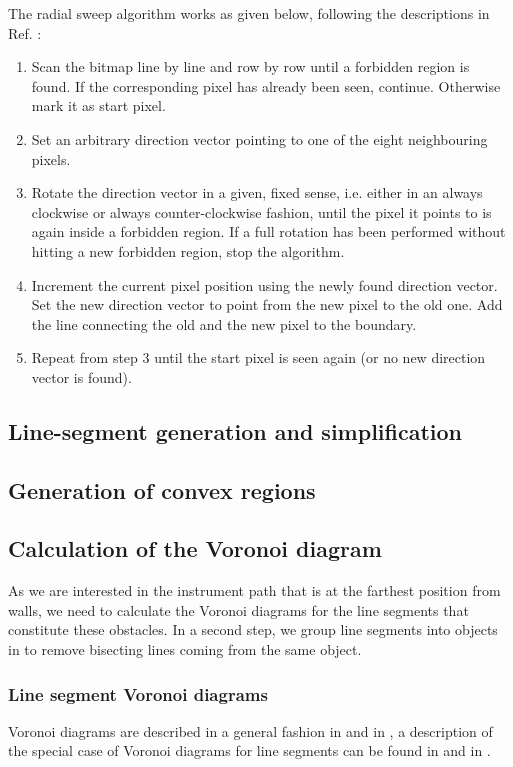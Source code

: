 The radial sweep algorithm works as given below, following the descriptions in Ref. \cite{web_radial_sweep}:
\begin{enumerate}
	\item Scan the bitmap line by line and row by row until a forbidden region is found. 
		If the corresponding pixel has already been seen, continue. Otherwise mark it as start pixel.
	\item Set an arbitrary direction vector pointing to one of the eight neighbouring pixels.
	\item Rotate the direction vector in a given, fixed sense, i.e. either in an always clockwise or 
		always counter-clockwise fashion, until the pixel it points to is again inside a forbidden region.
		If a full rotation has been performed without hitting a new forbidden region, stop the algorithm.
	\item Increment the current pixel position using the newly found direction vector. 
		Set the new direction vector to point from the new pixel to the old one.
		Add the line connecting the old and the new pixel to the boundary.
	\item Repeat from step 3 until the start pixel is seen again (or no new direction vector is found).
\end{enumerate}



\subsection{Line-segment generation and simplification}



\subsection{Generation of convex regions}



\subsection{Calculation of the Voronoi diagram}
As we are interested in the instrument path that is at the farthest position from walls, we need to calculate
the Voronoi diagrams for the line segments that constitute these obstacles. In a second step, we group line
segments into objects in to remove bisecting lines coming from the same object.

\subsubsection*{Line segment Voronoi diagrams}
Voronoi diagrams are described in a general fashion in \cite[Ch. 7, pp. 147f]{Berg2008} and in
\cite[Ch. 5, pp. 209f]{Berg2008}, a description of the special case of Voronoi diagrams for line segments can be
found in \cite[Ch. 7.3, pp. 160-163]{Berg2008} and in \cite[pp. 242-247]{FUH_geo2020}.

